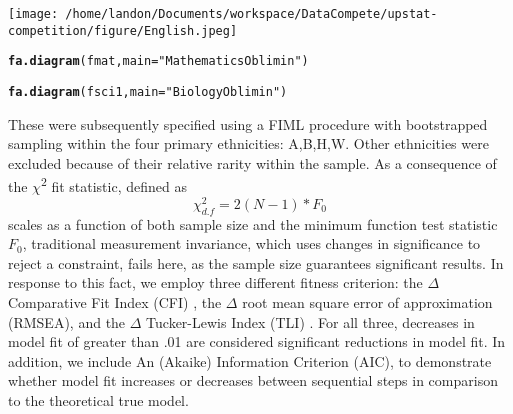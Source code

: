 \documentclass{article}\usepackage[]{graphicx}\usepackage[]{color}
\makeatletter
\newcommand{\hlstr}[1]{\textcolor[rgb]{0.192,0.494,0.8}{#1}}%
\newcommand{\hlstd}[1]{\textcolor[rgb]{0.345,0.345,0.345}{#1}}%
\newcommand{\hlkwc}[1]{\textcolor[rgb]{0.333,0.667,0.333}{#1}}%
\newcommand{\hlkwd}[1]{\textcolor[rgb]{0.737,0.353,0.396}{\textbf{#1}}}%
\newenvironment{kframe}{%
 \def\at@end@of@kframe{}%
 \ifinner\ifhmode%
  \def\at@end@of@kframe{\end{minipage}}%
  \begin{minipage}{\columnwidth}%
 \fi\fi%
 \def\FrameCommand##1{\hskip\@totalleftmargin \hskip-\fboxsep
 \colorbox{shadecolor}{##1}\hskip-\fboxsep
     \hskip-\linewidth \hskip-\@totalleftmargin \hskip\columnwidth}%
 \MakeFramed {\advance\hsize-\width
   \@totalleftmargin\z@ \linewidth\hsize
   \@setminipage}}%
 {\par\unskip\endMakeFramed%
 \at@end@of@kframe}
\newenvironment{knitrout}{}{} %
\makeatother
\begin{document}
\texttt{[image: /home/landon/Documents/workspace/DataCompete/upstat-competition/figure/English.jpeg]}

\begin{knitrout}
\color{fgcolor}\begin{kframe}
\begin{alltt}
\hlkwd{fa.diagram}\hlstd{(fmat,} \hlkwc{main} \hlstd{=} \hlstr{"Mathematics Oblimin"}\hlstd{)}
\end{alltt}


{\ttfamily\noindent\bfseries{}}\end{kframe}
\end{knitrout}


\begin{knitrout}
\color{fgcolor}\begin{kframe}
\begin{alltt}
\hlkwd{fa.diagram}\hlstd{(fsci1,} \hlkwc{main} \hlstd{=} \hlstr{"Biology Oblimin"}\hlstd{)}
\end{alltt}


{\ttfamily\noindent\bfseries{}}\end{kframe}
\end{knitrout}


These were subsequently specified using a FIML procedure with bootstrapped sampling within the four primary ethnicities: A,B,H,W. Other ethnicities were excluded because of their relative rarity within the sample. As a consequence of the $\chi$\textsuperscript{2} fit statistic, defined as \begin{equation} \chi^2_{d.f}=2(N-1) * F_0 \end{equation} scales as a function of both sample size and the minimum function test statistic $F_0$, traditional measurement invariance, which uses changes in significance to reject a constraint, fails here, as the sample size guarantees significant results. In response to this fact, we employ three different fitness criterion: the $\Delta$ Comparative Fit Index (CFI) \cite{Bentler}, the $\Delta$ root mean square error of approximation (RMSEA), and the $\Delta$ Tucker-Lewis Index (TLI) \cite{Chen}. For all three, decreases in model fit of greater than .01 are considered significant reductions in model fit. In addition, we include An (Akaike) Information Criterion (AIC), to demonstrate whether model fit increases or decreases between sequential steps in comparison to the theoretical true model.
\end{document}
